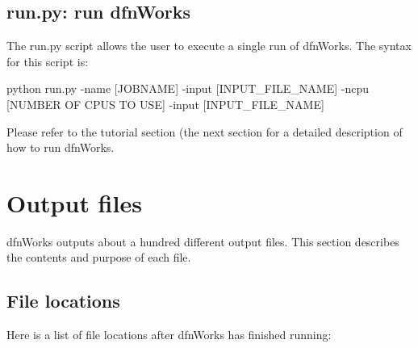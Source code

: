 \documentclass[letterpaper,10pt,english]{sphinxmanual}
\begin{document}
\section{run.py: run dfnWorks}
\label{\detokenize{scripts:run-py-run-dfnworks}}
The run.py script allows the user to execute a single run of dfnWorks. The syntax for this script is:

python run.py -name {[}JOBNAME{]} -input {[}INPUT\_FILE\_NAME{]} -ncpu {[}NUMBER OF CPUS TO USE{]} -input {[}INPUT\_FILE\_NAME{]}

Please refer to the tutorial section (the next section for a detailed description of how to run dfnWorks.


\chapter{Output files}
\label{\detokenize{output:output-files}}\label{\detokenize{output::doc}}
dfnWorks outputs about a hundred different output files. This section describes the contents and purpose of each file.


\section{File locations}
\label{\detokenize{output:file-locations}}
Here is a list of file locations after dfnWorks has finished running:
\end{document}
